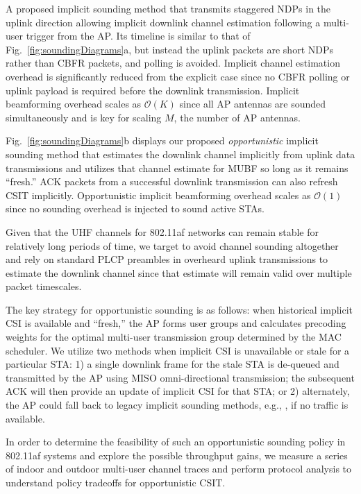 A proposed implicit sounding method \cite{lou2013comparison} that transmits staggered \acp{NDP} in the uplink direction allowing implicit downlink channel estimation following a multi-user trigger from the \ac{AP}.
 Its timeline is similar to that of Fig.~\ref{fig:soundingDiagrams}a, but instead the uplink packets are short \acp{NDP} rather than \ac{CBFR} packets, and polling is avoided.
 Implicit channel estimation overhead is significantly reduced from the explicit case since no \ac{CBFR} polling or uplink payload is required before the downlink transmission.
 Implicit beamforming overhead scales as $\mathcal{O}(K)$ since all \ac{AP} antennas are sounded simultaneously and is key for scaling $M$, the number of \ac{AP} antennas.

 Fig.~\ref{fig:soundingDiagrams}b displays our proposed \textit{opportunistic} implicit sounding method that estimates the downlink channel implicitly from uplink data transmissions and utilizes that channel estimate for \ac{MUBF} so long as it remains ``fresh.''
 \ac{ACK} packets from a successful downlink transmission can also refresh \ac{CSIT} implicitly.
 Opportunistic implicit beamforming overhead scales as $\mathcal{O}(1)$ since no sounding overhead is injected to sound active \acp{STA}.

 Given that the UHF channels for 802.11af networks can remain stable for relatively long periods of time, we target to avoid channel sounding altogether and rely on standard PLCP preambles \cite{std11af} in overheard uplink transmissions to estimate the downlink channel since that estimate will remain valid over multiple packet timescales.

 The key strategy for opportunistic sounding is as follows: when historical implicit CSI is available and ``fresh,'' the \ac{AP} forms user groups and calculates precoding weights for the optimal multi-user transmission group determined by the MAC scheduler.
 We utilize two methods when implicit \ac{CSI} is unavailable or stale for a particular \ac{STA}: 1) a single downlink frame for the stale \ac{STA} is de-queued and transmitted by the AP using MISO omni-directional transmission; the subsequent \ac{ACK} will then provide an update of implicit \ac{CSI} for that \ac{STA}; or 2) alternately, the \ac{AP} could fall back to legacy implicit sounding methods, e.g., \cite{lou2013comparison}, if no traffic is available.

 In order to determine the feasibility of such an opportunistic sounding policy in 802.11af systems and explore the possible throughput gains, we measure a series of indoor and outdoor multi-user channel traces and perform protocol analysis to understand policy tradeoffs for opportunistic \ac{CSIT}.
	
